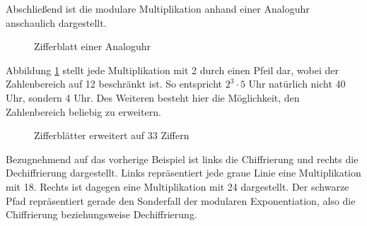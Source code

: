 \documentclass{paper}
\theoremstyle{classic}
\begin{document}
Abschließend ist die modulare Multiplikation anhand einer Analoguhr anschaulich dargestellt.

\begin{figure}[ht]\centering
\caption{Zifferblatt einer Analoguhr}
\label{fig:2}
\vspace{6pt}
\begin{tikzpicture}

\end{tikzpicture}
\end{figure}
Abbildung \ref{fig:2} stellt jede Multiplikation mit 2 durch einen Pfeil dar, wobei der Zahlenbereich auf 12 beschränkt ist. So entspricht \(2^3 \cdot 5\) Uhr natürlich nicht 40 Uhr, sondern 4 Uhr. Des Weiteren besteht hier die Möglichkeit, den Zahlenbereich beliebig zu erweitern.

\begin{figure}[ht]\centering
\caption{Zifferblätter erweitert auf 33 Ziffern}
\label{fig:3}
\vspace{6pt}
\hfill
\begin{tikzpicture}

\end{tikzpicture}
\hfill
\begin{tikzpicture}

\end{tikzpicture}
\hfill
\end{figure}
Bezugnehmend auf das vorherige Beispiel ist links die Chiffrierung und rechts die Dechiffrierung dargestellt. Links repräsentiert jede graue Linie eine Multiplikation mit 18. Rechts ist dagegen eine Multiplikation mit 24 dargestellt. Der schwarze Pfad repräsentiert gerade den Sonderfall der modularen Exponentiation, also die Chiffrierung beziehungsweise Dechiffrierung.

\newpage




\end{document}
